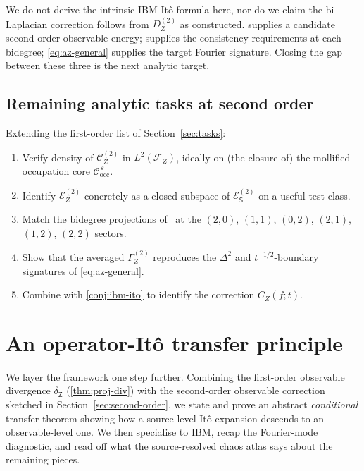 \documentclass[11pt,reqno]{amsart}
\theoremstyle{plain}
\theoremstyle{definition}
\theoremstyle{remark}
\newcommand{\Energy}{\mathcal{E}}
\newcommand{\Source}{\mathsf{S}}
\newcommand{\Obs}{\mathsf{Z}}
\newcommand{\IBM}{Z}
\newcommand{\Carre}{\Gamma}
\begin{document}
We do not derive the intrinsic IBM It\^o formula here, nor do we claim
the bi-Laplacian correction follows from $D_\IBM^{(2)}$ as constructed.
 supplies a candidate second-order
observable energy; \cite{Fontes-IBMchaos} supplies the consistency
requirements at each bidegree; \eqref{eq:az-general} supplies the
target Fourier signature. Closing the gap between these three is the
next analytic target.

\subsection*{Remaining analytic tasks at second order}

Extending the first-order list of Section~\ref{sec:tasks}:
\begin{enumerate}
\item Verify density of $\mathcal C_\IBM^{(2)}$ in
  $L^{2}(\mathcal F_\IBM)$, ideally on (the closure of) the mollified
  occupation core $\mathcal C_{\mathrm{occ}}^{\,\varepsilon}$.
\item Identify $\Energy_\IBM^{(2)}$ concretely as a closed subspace of
  $\Energy_\Source^{(2)}$ on a useful test class.
\item Match the bidegree projections of~\cite{Fontes-IBMchaos} at the
  $(2,0)$, $(1,1)$, $(0,2)$, $(2,1)$, $(1,2)$, $(2,2)$ sectors.
\item Show that the averaged $\Carre^{(2)}_\IBM$ reproduces the
  $\Delta^{2}$ and $t^{-1/2}$-boundary signatures of
  \eqref{eq:az-general}.
\item Combine with \cref{conj:ibm-ito} to identify the correction
  $C_\IBM(f;t)$.
\end{enumerate}

\section{An operator-It\^o transfer principle}\label{sec:transfer}
\label{sec:ibm-ito}

We layer the framework one step further. Combining the first-order
observable divergence $\delta_\Obs$ (\cref{thm:proj-div}) with the
second-order observable correction sketched in
Section~\ref{sec:second-order}, we state and prove an abstract
\emph{conditional} transfer theorem showing how a source-level It\^o
expansion descends to an observable-level one. We then specialise to
IBM, recap the Fourier-mode diagnostic, and read off what the
source-resolved chaos atlas says about the remaining pieces.
\end{document}
